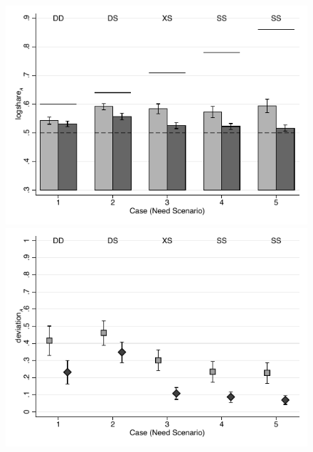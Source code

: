 \documentclass[smallcondensed]{svjour3}
\begin{document}
\begin{figure}[ht!]
   \includegraphics[scale=0.4]{figures/main_share_need.pdf}\includegraphics[scale=0.4]{figures/main_deviation_need.pdf}

\end{figure}
\end{document}

